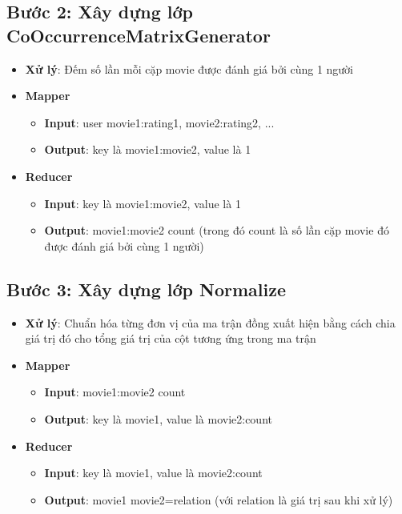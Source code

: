 \subsection*{Bước 2: Xây dựng lớp CoOccurrenceMatrixGenerator}
\begin{itemize}
    \item \textbf{Xử lý}: Đếm số lần mỗi cặp movie được đánh giá bởi cùng 1 người \\
    \item \textbf{Mapper}
          \begin{itemize}
              \item \textbf{Input}: user \quad movie1:rating1, movie2:rating2, ... \\
              \item \textbf{Output}: key là movie1:movie2, value là 1 \\
          \end{itemize}
    \item \textbf{Reducer}
          \begin{itemize}
              \item \textbf{Input}: key là movie1:movie2, value là 1 \\
              \item \textbf{Output}: movie1:movie2 \quad count (trong đó
                    count là số lần cặp movie đó được đánh giá bởi cùng 1 người) \\
          \end{itemize}
\end{itemize}
\subsection*{Bước 3: Xây dựng lớp Normalize}
\begin{itemize}
    \item \textbf{Xử lý}: Chuẩn hóa từng đơn vị của ma trận đồng xuất hiện
          bằng cách chia giá trị đó cho tổng giá trị của cột tương ứng trong ma trận
    \item \textbf{Mapper}
          \begin{itemize}
              \item \textbf{Input}: movie1:movie2 \quad count \\
              \item \textbf{Output}: key là movie1, value là movie2:count \\
          \end{itemize}
    \item \textbf{Reducer}
          \begin{itemize}
              \item \textbf{Input}: key là movie1, value là movie2:count \\
              \item \textbf{Output}: movie1 \quad movie2=relation (với relation
                    là giá trị sau khi xử lý) \\
          \end{itemize}
\end{itemize}
